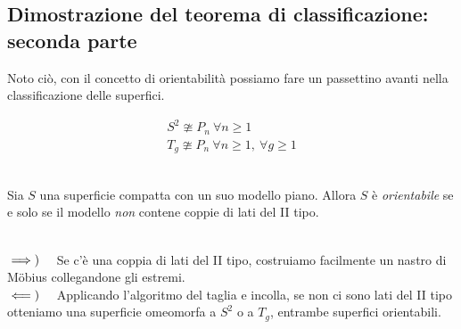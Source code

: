 \subsection{Dimostrazione del teorema di classificazione: seconda parte}
Noto ciò, con il concetto di orientabilità possiamo fare un passettino avanti nella classificazione delle superfici.
\begin{corollary}
	\begin{gather*}
		S^2 \ncong P_n\ \forall n\geq 1\\
		T_g \ncong P_n\ \forall n\geq 1,\ \forall g\geq 1
	\end{gather*}
\vspace{-6mm}
\end{corollary}
\begin{corollary}~{}\\
	Sia $S$ una superficie compatta con un suo modello piano. Allora $S$ è \textit{orientabile} se e solo se il modello \textit{non} contene coppie di lati del II tipo.
\end{corollary}
\begin{demonstration}~{}\\
$\implies)\quad$ Se c'è una coppia di lati del II tipo, costruiamo facilmente un nastro di Möbius collegandone gli estremi.\\
$\impliedby)\quad$ Applicando l'algoritmo del taglia e incolla, se non ci sono lati del II tipo otteniamo una superficie omeomorfa a $S^2$ o a $T_g$, entrambe superfici orientabili.
\end{demonstration}
